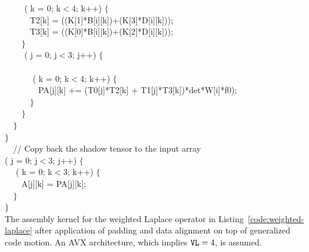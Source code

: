 \begin{algorithm}[htpb]
~~~~ ( k = 0; k$<$4; k++) $\lbrace$ \\
~~~~~~T2[k] = ((K[1]*B[i][k])+(K[3]*D[i][k]));\\
~~~~~~T3[k] = ((K[0]*B[i][k])+(K[2]*D[i][k]));\\
~~~~$\rbrace$\\
~~~~ ( j = 0; j$<$3; j++) $\lbrace$\\
~~~~~~\\
~~~~~~ ( k = 0; k$<$4; k++) $\lbrace$\\
~~~~~~~~PA[j][k] += (T0[j]*T2[k] + T1[j]*T3[k])*det*W[i]*f0);\\
~~~~~~$\rbrace$\\
~~~~$\rbrace$\\
~~$\rbrace$\\
$\rbrace$\\
~~// Copy back the shadow tensor to the input array \\
 ( j = 0; j$<$3; j++) $\lbrace$\\
~~ ( k = 0; k$<$3; k++) $\lbrace$\\
~~~~A[j][k] = PA[j][k];\\
~~$\rbrace$\\
$\rbrace$\\

\caption{The assembly kernel for the weighted Laplace operator in Listing~\ref{code:weighted-laplace} after application of padding and data alignment on top of generalized code motion. An AVX architecture, which implies $\mbox{\texttt{VL}}=4$, is assumed.}
\label{code:weighted-laplace-licm-pad}
\end{algorithm}

